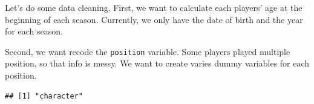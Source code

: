 \documentclass[
]{book}
\newenvironment{Shaded}{\begin{snugshade}}{\end{snugshade}}
\newcommand{\AttributeTok}[1]{\textcolor[rgb]{0.13,0.29,0.53}{#1}}
\newcommand{\CommentTok}[1]{\textcolor[rgb]{0.56,0.35,0.01}{\textit{#1}}}
\newcommand{\FunctionTok}[1]{\textcolor[rgb]{0.13,0.29,0.53}{\textbf{#1}}}
\newcommand{\NormalTok}[1]{#1}
\newcommand{\OtherTok}[1]{\textcolor[rgb]{0.56,0.35,0.01}{#1}}
\newcommand{\SpecialCharTok}[1]{\textcolor[rgb]{0.81,0.36,0.00}{\textbf{#1}}}
\begin{document}
Let's do some data cleaning. First, we want to calculate each players' age at the
beginning of each season. Currently, we only have the date of birth and the year
for each season.

Second, we want recode the \texttt{position} variable. Some players played multiple
position, so that info is messy. We want to create varies dummy variables
for each position.

\begin{Shaded}
\end{Shaded}

\begin{verbatim}
## [1] "character"
\end{verbatim}

\begin{Shaded}
\end{Shaded}
\end{document}
